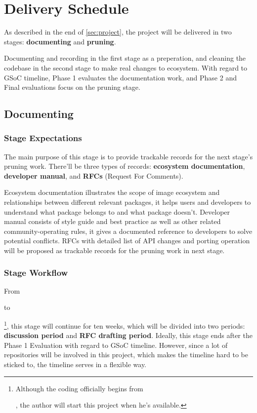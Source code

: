 
\section{Delivery Schedule}\label{sec:delivery}

As described in the end of \cref{sec:project}, the project will be delivered in two stages: \textbf{documenting} and \textbf{pruning}.

Documenting and recording in the first stage as a preperation, and cleaning the codebase in the second stage to make real changes to \images{} ecosystem. With regard to GSoC timeline, \textsf{Phase 1} evaluates the documentation work, and \textsf{Phase 2} and \textsf{Final} evaluations focus on the pruning stage.

\subsection{Documenting}\label{subsec:documentation}

\subsubsection*{Stage Expectations}

The main purpose of this stage is to provide trackable records for the next stage's pruning work. There'll be three types of records: \textbf{ecosystem documentation}, \textbf{developer manual}, and \textbf{RFCs} (Request For Comments). \par

Ecosystem documentation illustrates the scope of image ecosystem and relationships between different relevant packages, it helps users and developers to understand what package belongs to \images{} and what package doesn't. Developer manual consists of style guide and best practice as well as other related community-operating rules, it gives a documented reference to developers to solve potential conflicts. RFCs with detailed list of API changes and porting operation will be proposed as trackable records for the pruning work in next stage. \par

\subsubsection*{Stage Workflow}

From \date{April 22} to \date{June 24}\footnote{Although the coding officially begins from \date{May 27}, the author will start this project when he's available.}, this stage will continue for ten weeks, which will be divided into two periods: \textbf{discussion period} and \textbf{RFC drafting period}. Ideally, this stage ends after the \textsf{Phase 1 Evaluation} with regard to GSoC timeline. However, since a lot of repositories will be involved in this project, which makes the timeline hard to be sticked to, the timeline serves in a flexible way.\par

